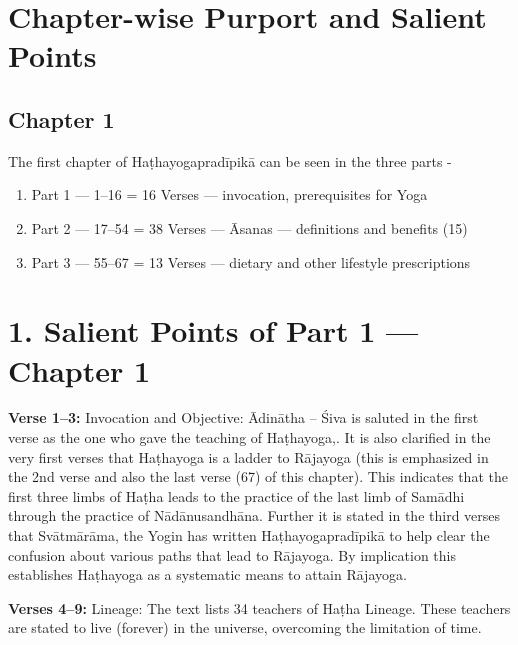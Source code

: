 \section*{Chapter-wise Purport and Salient Points}

\subsection*{Chapter 1}

The first chapter of Haṭhayogapradīpikā can be seen in the three parts - 
\vspace{-15pt}

\begin{enumerate}
\itemsep=0pt
\renewcommand{\theenumi}{\arabic{enumi}}
\renewcommand{\labelenumi}{\theenumi)}
\item Part 1 --- 1--16      =  16 Verses --- invocation, prerequisites for Yoga 
\item Part 2 --- 17--54    =  38 Verses --- Āsanas --- definitions and benefits (15)
\item Part 3 --- 55--67    =  13 Verses --- dietary and other lifestyle prescriptions
\end{enumerate}

\section*{1. Salient Points of Part 1 --- Chapter 1}

\textbf{Verse 1--3:}  Invocation and Objective: Ādinātha –  Śiva is saluted in the first verse as the one who gave the teaching of Haṭhayoga,. It is also clarified in the very first verses that Haṭhayoga is a ladder to Rājayoga (this is emphasized in the 2nd verse and also the last verse (67)  of this chapter). This indicates that the first three limbs of Haṭha leads to the practice of the last limb of Samādhi through the practice of Nādānusandhāna. Further it is stated in the third verses that Svātmārāma, the Yogin has written Haṭhayogapradīpikā to help clear the confusion about various paths that lead to Rājayoga. By implication this establishes Haṭhayoga as a systematic means to attain Rājayoga.

\textbf{Verses  4--9:} Lineage: The text lists 34 teachers of Haṭha Lineage. These teachers are stated to live (forever) in the universe, overcoming the limitation of time.

